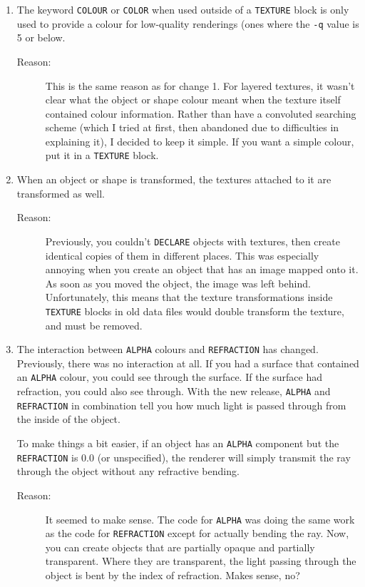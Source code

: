 \begin{enumerate}
\item The keyword {\tt COLOUR} or {\tt COLOR} when used outside of a
{\tt TEXTURE} block is only used to provide a colour for low-quality
renderings (ones where the {\tt -q} value is 5 or below.
\begin{description}
\item[Reason:] This is the same reason as for change 1.  For layered
textures, it wasn't clear what the object or shape colour meant when
the texture itself contained colour information.  Rather than have a
convoluted searching scheme (which I tried at first, then abandoned
due to difficulties in explaining it), I decided to keep it simple.
If you want a simple colour, put it in a {\tt TEXTURE} block.
\end{description}

\item When an object or shape is transformed, the textures attached to it are
transformed as well.
\begin{description}
\item[Reason:] Previously, you couldn't {\tt DECLARE}
objects with
textures, then create identical copies of them in different places.
This was especially annoying when you create an object that has an
image mapped onto it.  As soon as you moved the object, the image was
left behind.  Unfortunately, this means that the texture
transformations inside {\tt TEXTURE} blocks in old data files would double
transform the texture, and must be removed.
\end{description}

\item The interaction between {\tt ALPHA} colours
and {\tt REFRACTION}
has changed.  Previously, there was no interaction at all.  If you had
a surface that contained an {\tt ALPHA} colour, you could see through
the surface.  If the surface had refraction, you could also see
through.  With the new release, {\tt ALPHA} and {\tt REFRACTION} in
combination tell you how much light is passed through from the inside
of the object.

To make things a bit easier, if an object has an {\tt ALPHA} component
but the {\tt REFRACTION} is 0.0 (or unspecified), the renderer will
simply transmit the ray through the object without any refractive
bending.
\begin{description}
\item[Reason:] It seemed to make sense.  The code for {\tt ALPHA} was
doing the same work as the code for {\tt REFRACTION} except for
actually bending the ray.  Now, you can create objects that are
partially opaque and partially transparent. Where they are
transparent, the light passing through the object is bent by the index
of refraction.  Makes sense, no?
\end{description}


\end{enumerate}
